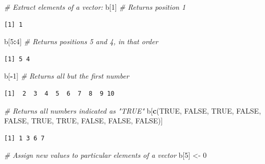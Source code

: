 \documentclass[12pt,]{book}
\newenvironment{Shaded}{\begin{snugshade}}{\end{snugshade}}
\newcommand{\CommentTok}[1]{\textcolor[rgb]{0.56,0.35,0.01}{\textit{#1}}}
\newcommand{\DecValTok}[1]{\textcolor[rgb]{0.00,0.00,0.81}{#1}}
\newcommand{\KeywordTok}[1]{\textcolor[rgb]{0.13,0.29,0.53}{\textbf{#1}}}
\newcommand{\NormalTok}[1]{#1}
\newcommand{\OperatorTok}[1]{\textcolor[rgb]{0.81,0.36,0.00}{\textbf{#1}}}
\newcommand{\OtherTok}[1]{\textcolor[rgb]{0.56,0.35,0.01}{#1}}
\newcommand{\StringTok}[1]{\textcolor[rgb]{0.31,0.60,0.02}{#1}}
\begin{document}
\begin{Shaded}
\begin{Highlighting}[]
\CommentTok{# Extract elements of a vector:}
\NormalTok{b[}\DecValTok{1}\NormalTok{]                   }\CommentTok{# Returns position 1}
\end{Highlighting}
\end{Shaded}

\begin{verbatim}
[1] 1
\end{verbatim}

\begin{Shaded}
\begin{Highlighting}[]
\NormalTok{b[}\DecValTok{5}\OperatorTok{:}\DecValTok{4}\NormalTok{]                 }\CommentTok{# Returns positions 5 and 4, in that order}
\end{Highlighting}
\end{Shaded}

\begin{verbatim}
[1] 5 4
\end{verbatim}

\begin{Shaded}
\begin{Highlighting}[]
\NormalTok{b[}\OperatorTok{-}\DecValTok{1}\NormalTok{]                  }\CommentTok{# Returns all but the first number  }
\end{Highlighting}
\end{Shaded}

\begin{verbatim}
[1]  2  3  4  5  6  7  8  9 10
\end{verbatim}

\begin{Shaded}
\begin{Highlighting}[]
\CommentTok{# Returns all numbers indicated as "TRUE"}
\NormalTok{b[}\KeywordTok{c}\NormalTok{(}\OtherTok{TRUE}\NormalTok{, }\OtherTok{FALSE}\NormalTok{, }\OtherTok{TRUE}\NormalTok{, }\OtherTok{FALSE}\NormalTok{, }\OtherTok{FALSE}\NormalTok{, }\OtherTok{TRUE}\NormalTok{, }\OtherTok{TRUE}\NormalTok{, }\OtherTok{FALSE}\NormalTok{, }\OtherTok{FALSE}\NormalTok{, }\OtherTok{FALSE}\NormalTok{)]  }
\end{Highlighting}
\end{Shaded}

\begin{verbatim}
[1] 1 3 6 7
\end{verbatim}

\begin{Shaded}
\begin{Highlighting}[]
\CommentTok{# Assign new values to particular elements of a vector}
\NormalTok{b[}\DecValTok{5}\NormalTok{] <-}\StringTok{ }\DecValTok{0}
\end{Highlighting}
\end{Shaded}
\end{document}
